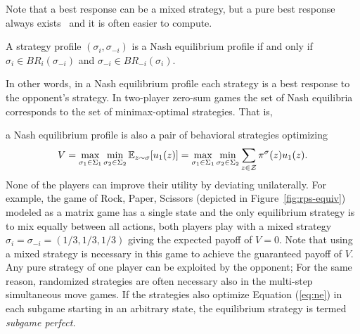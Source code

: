 {Note that a best response can be a mixed strategy, but a pure best response always exists~\cite{Gintis09} and it is often easier to compute.

\begin{definition}
A strategy profile $(\sigma_i, \sigma_{-i})$ is a Nash equilibrium profile if and only if $\sigma_i \in BR_i(\sigma_{-i})$
and $\sigma_{-i} \in BR_{-i}(\sigma_i)$.
\end{definition}

In other words, in a Nash equilibrium profile each strategy is a best response to the opponent's strategy. In two-player zero-sum
games the set of Nash equilibria corresponds to the set of minimax-optimal strategies. That is,} a Nash equilibrium profile is
also a pair of behavioral strategies optimizing
\begin{equation}\label{eq:ne}
V = \max_{\sigma_1 \in \Sigma_1} \min_{\sigma_2 \in \Sigma_2} \mathbb{E}_{z \sim \sigma}[u_1(z)]
  = \max_{\sigma_1 \in \Sigma_1} \min_{\sigma_2 \in \Sigma_2} \sum_{z \in \mathcal{Z}} \pi^\sigma(z) u_1(z).
\end{equation}
None of the players can improve their utility by deviating unilaterally.
For example, the game of Rock, Paper, Scissors (depicted in Figure~\ref{fig:rps-equiv}) modeled as a matrix game has a single state and the only equilibrium strategy is to mix equally between
all actions, \ie both players play with a mixed strategy $\sigma_i = \sigma_{-i} = (1/3, 1/3, 1/3)$ giving the expected payoff of
$V = 0$.
Note that using a mixed strategy is necessary in this game to achieve the guaranteed payoff of $V$.
Any pure strategy of one player can be exploited by the opponent; 
For the same reason, randomized strategies are often necessary also in the multi-step simultaneous move games.
If the strategies also optimize Equation (\ref{eq:ne}) in each subgame starting in an arbitrary state, the equilibrium strategy
is termed {\it subgame perfect.}

